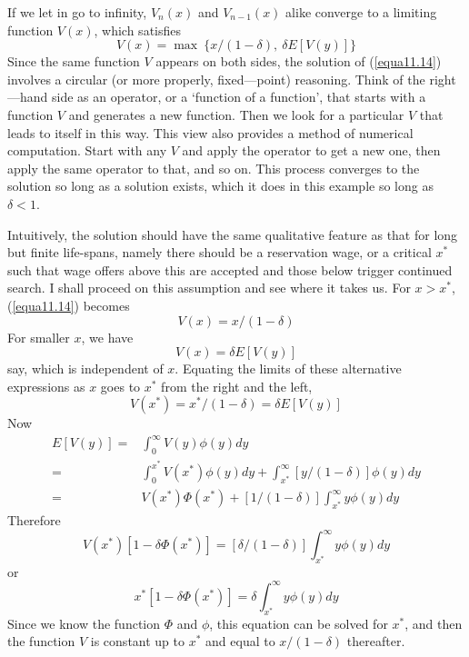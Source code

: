 If we let in go to infinity, $V_n(x)$ and $V_{n-1}(x)$ alike converge to a limiting function $V(x)$, which satisfies
\begin{equation} \label{equa11.14}
 V(x) = \max \ \{ x/(1-\delta), \ \delta E[V(y) ]  \}
\end{equation}
Since the same function $V$ appears on both sides, the solution of (\ref{equa11.14}) involves a circular (or more properly, fixed—point) reasoning. Think of the right—hand side as an operator, or a `function of a function', that starts with a function $V$ and generates a new function. Then we look for a particular $V$ that leads to itself in this way. This view also provides a method of numerical computation. Start with any $V$ and apply the operator to get a new one, then apply the same operator to that, and so on. This process converges to the solution so long as a solution exists, which it does in this example so long as $\delta < 1$.

Intuitively, the solution should have the same qualitative feature as that for long but finite life-spans, namely there should be a reservation wage, or a critical $x^*$ such that wage offers above this are accepted and those below trigger continued search. I shall proceed on this assumption and see where it takes us. For $x > x^*$, (\ref{equa11.14}) becomes
\begin{equation*}
 V(x) = x/(1-\delta)
\end{equation*}
For smaller $x$, we have
\begin{equation*}
 V(x) = \delta E[V(y)]
\end{equation*}
say, which is independent of $x$. Equating the limits of these alternative expressions as $x$ goes to $x^*$ from the right and the left,
\begin{equation} \label{equa11.15}
 V(x^*) = x^* /(1-\delta) = \delta E[V(y)]
\end{equation}
Now
\begin{equation*}
\begin{array}{rl}
 E[V(y)] = & \int_0^\infty V(y) \phi(y) dy \\
         = & \int_0^{x^*} V(x^*) \phi(y) dy + \int_{x^*}^\infty [y/(1-\delta)] \phi(y) dy \\
         = & V(x^*) \Phi(x^*) + [1/(1-\delta)] \int_{x^*}^\infty y \phi(y) dy
\end{array}
\end{equation*}
Therefore
\begin{equation*}
 V(x^*) [1- \delta \Phi (x^*)] = [\delta/(1-\delta)] \int_{x^*}^\infty y \phi(y)dy
\end{equation*}
or
\begin{equation} \label{equa11.16}
 x^* [1-\delta \Phi(x^*)] = \delta \int_{x^*}^\infty y \phi(y) dy
\end{equation}
Since we know the function $\Phi$ and $\phi$, this equation can be solved for $x^*$, and then the function $V$ is constant up to $x^*$ and equal to $x/(1-\delta)$ thereafter.

